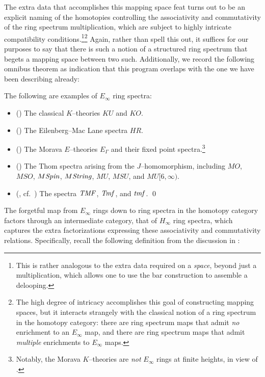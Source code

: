 The extra data that accomplishes this mapping space feat turns out to be an explicit naming of the homotopies controlling the associativity and commutativity of the ring spectrum multiplication, which are subject to highly intricate compatibility conditions.\footnote{This is rather analogous to the extra data required on a \emph{space}, beyond just a multiplication, which allows one to use the bar construction to assemble a delooping.}\footnote{The high degree of intricacy accomplishes this goal of constructing mapping spaces, but it interacts strangely with the classical notion of a ring spectrum in the homotopy category: there are ring spectrum maps that admit \emph{no} enrichment to an $E_\infty$ map, and there are ring spectrum maps that admit \emph{multiple} enrichments to $E_\infty$ maps.}  Again, rather than spell this out, it suffices for our purposes to say that there is such a notion of a structured ring spectrum that begets a mapping space between two such.  Additionally, we record the following omnibus theorem as indication that this program overlaps with the one we have been describing already:
\begin{theorem}
The following are examples of $E_\infty$ ring spectra:
\begin{itemize}
    \item (\cite[Section VIII.1]{MayRingSpacesSpectra}) The classical $K$--theories $KU$ and $KO$.
    \item (\cite[Section VIII.1]{MayRingSpacesSpectra}) The Eilenberg--Mac Lane spectra $HR$.
    \item (\cite[Corollary 7.6--7]{GoerssHopkins}) The Morava $E$--theories $E_\Gamma$ and their fixed point spectra.\footnote{Notably, the Morava $K$--theories are \emph{not} $E_\infty$ rings at finite heights, in view of .}
    \item (\cite[Section IV.3]{MayRingSpacesSpectra}) The Thom spectra arising from the $J$--homomorphism, including $MO$, $MSO$, $M\mathit{Spin}$, $M\mathit{String}$, $MU$, $MSU$, and $MU[6, \infty)$.
    \item (, cf.\ ) The spectra $\mathit{TMF}$, $\mathit{Tmf}$, and $\mathit{tmf}$. \qed
\end{itemize}
\end{theorem}

The forgetful map from $E_\infty$ rings down to ring spectra in the homotopy category factors through an intermediate category, that of $H_\infty$ ring spectra, which captures the extra factorizations expressing these associativity and commutativity relations.  Specifically, recall the following definition from the discussion in :

